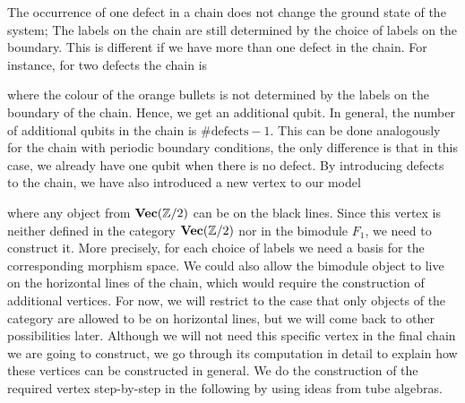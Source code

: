 The occurrence of one defect in a chain does not change the ground state of the system; The labels on the chain are still determined by the choice of labels on the boundary. This is different if we have more than one defect in the chain. For instance, for two defects the chain is
	\begin{figure}[H]
	\end{figure}
\noindent
where the colour of the orange bullets is not determined by the labels on the boundary of the chain. Hence, we get an additional qubit. In general, the number of additional qubits in the chain is $\#\mathrm{defects}-1$. This can be done analogously for the chain with periodic boundary conditions, the only difference is that in this case, we already have one qubit when there is no defect. By introducing defects to the chain, we have also introduced a new vertex to our model
	\begin{figure}[H]	
	\end{figure}
\noindent
where any object from $\textbf{Vec}(\mathbb{Z}/2)$ can be on the black lines. Since this vertex is neither defined in the category $\textbf{Vec}(\mathbb{Z}/2)$ nor in the bimodule $F_1$, we need to construct it. More precisely, for each choice of labels we need a basis for the corresponding morphism space. We could also allow the bimodule object to live on the horizontal lines of the chain, which would require the construction of additional vertices. For now, we will restrict to the case that only objects of the category are allowed to be on horizontal lines, but we will come back to other possibilities later. Although we will not need this specific vertex in the final chain we are going to construct, we go through its computation in detail to explain how these vertices can be constructed in general. We do the construction of the required vertex step-by-step in the following by using ideas from tube algebras. 

